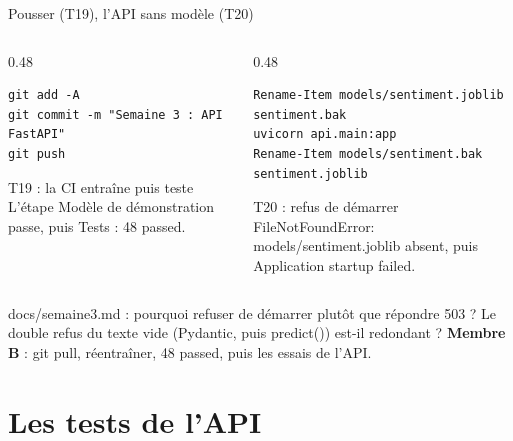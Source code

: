 \documentclass[aspectratio=169,11pt]{beamer}
\newcommand{\co}[1]{{\ttfamily\hyphenchar\font=45\relax #1}}
\begin{document}
\begin{frame}[fragile]{Pousser (T19), l'API sans modèle (T20)}
\begin{columns}[T]
\begin{column}{0.48\textwidth}
\begin{lstlisting}
git add -A
git commit -m "Semaine 3 : API FastAPI"
git push
\end{lstlisting}
\begin{exampleblock}{T19 : la CI entraîne puis teste}
L'étape \og Modèle de démonstration \fg{} passe, puis \og Tests \fg{} : 48 passed.
\end{exampleblock}
\end{column}
\begin{column}{0.48\textwidth}
\begin{lstlisting}
Rename-Item models/sentiment.joblib sentiment.bak
uvicorn api.main:app
Rename-Item models/sentiment.bak sentiment.joblib
\end{lstlisting}
\begin{exampleblock}{T20 : refus de démarrer}
\co{FileNotFoundError: models/sentiment.joblib absent}, puis \co{Application startup failed}.
\end{exampleblock}
\end{column}
\end{columns}
\medskip
\small \co{docs/semaine3.md} : pourquoi refuser de démarrer plutôt que répondre 503 ? Le double refus du texte
vide (Pydantic, puis \co{predict()}) est-il redondant ? \textbf{Membre B} : \co{git pull}, réentraîner,
48 passed, puis les essais de l'API.
\end{frame}

\section{Les tests de l'API}
\end{document}

